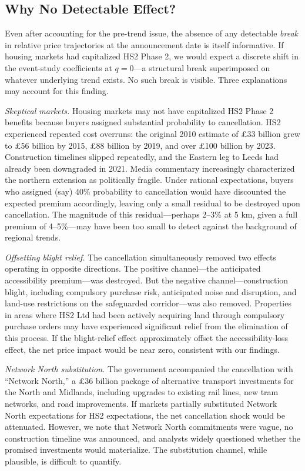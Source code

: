 \documentclass[12pt]{article}
\begin{document}
\subsection{Why No Detectable Effect?}

Even after accounting for the pre-trend issue, the absence of any detectable \textit{break} in relative price trajectories at the announcement date is itself informative. If housing markets had capitalized HS2 Phase 2, we would expect a discrete shift in the event-study coefficients at $q = 0$---a structural break superimposed on whatever underlying trend exists. No such break is visible. Three explanations may account for this finding.

\textit{Skeptical markets.} Housing markets may not have capitalized HS2 Phase 2 benefits because buyers assigned substantial probability to cancellation. HS2 experienced repeated cost overruns: the original 2010 estimate of \pounds 33 billion grew to \pounds 56 billion by 2015, \pounds 88 billion by 2019, and over \pounds 100 billion by 2023. Construction timelines slipped repeatedly, and the Eastern leg to Leeds had already been downgraded in 2021. Media commentary increasingly characterized the northern extension as politically fragile. Under rational expectations, buyers who assigned (say) 40\% probability to cancellation would have discounted the expected premium accordingly, leaving only a small residual to be destroyed upon cancellation. The magnitude of this residual---perhaps 2--3\% at 5 km, given a full premium of 4--5\%---may have been too small to detect against the background of regional trends.

\textit{Offsetting blight relief.} The cancellation simultaneously removed two effects operating in opposite directions. The positive channel---the anticipated accessibility premium---was destroyed. But the negative channel---construction blight, including compulsory purchase risk, anticipated noise and disruption, and land-use restrictions on the safeguarded corridor---was also removed. Properties in areas where HS2 Ltd had been actively acquiring land through compulsory purchase orders may have experienced significant relief from the elimination of this process. If the blight-relief effect approximately offset the accessibility-loss effect, the net price impact would be near zero, consistent with our findings.

\textit{Network North substitution.} The government accompanied the cancellation with ``Network North,'' a \pounds 36 billion package of alternative transport investments for the North and Midlands, including upgrades to existing rail lines, new tram networks, and road improvements. If markets partially substituted Network North expectations for HS2 expectations, the net cancellation shock would be attenuated. However, we note that Network North commitments were vague, no construction timeline was announced, and analysts widely questioned whether the promised investments would materialize. The substitution channel, while plausible, is difficult to quantify.
\end{document}

